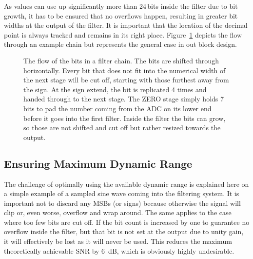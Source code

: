As values can use up significantly  more than \num{24}\,bits inside the filter
due to bit growth, it has to be ensured that no overflows happen, resulting in
greater  bit widths at  the output  of the  filter.  It  is important  that the
location  of the  decimal point  is always  tracked and  remains in  its right
place.  Figure~\ref{fig:fpga:bitflow} depicts the flow through an example chain
but represents the general case in out block design.

\begin{figure}
    \centering
    
    \caption[Bit Flow in Filter Chain]{%
        The flow of  the bits in a filter chain. The  bits are shifted through
        horizontally. Every bit that does not fit into the numerical width of
        the next stage will be cut off, starting with those furthest away from
        the sign. At the  sign extend, the bit is replicated  \num{4} times and
        handed through to the next  stage. The ZERO stage simply holds \num{7}
         bits to pad the number coming from the ADC on its lower end
        before it goes  into the first filter. Inside the filter  the bits can
        grow, so those are not shifted  and cut off but rather resized towards
        the output.%
    }
    \label{fig:fpga:bitflow}
\end{figure}

%
%
\subsection{Ensuring Maximum Dynamic Range} %
\label{subsec:fpga:maximize_dynamic_range}

The challenge of optimally using the available dynamic range is explained here
on a simple example  of a sampled sine wave coming  into the filtering system.
It  is important  not to  discard any  MSBs (or  signs) because  otherwise the
signal will clip or, even worse, overflow and wrap around. The same applies to
the case where too few bits are cut  off. If the bit count is increased by one
to guarantee  no overflow inside the  filter, but that  bit is not set  at the
output due  to unity gain,  it will  effectively be lost  as it will  never be
used.  This reduces  the maximum theoretically achievable  SNR by \SI{6}{\dB},
which is obviously highly undesirable.

